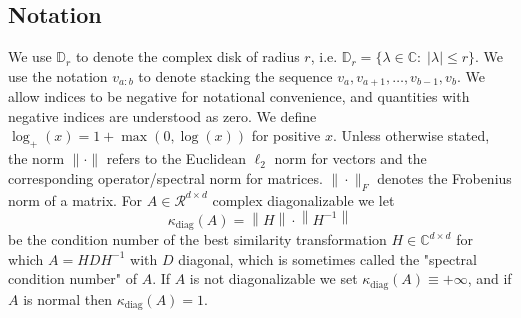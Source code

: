 \documentclass[11pt]{article}
\def\R{{\mathcal R}}
\newcommand{\norm}[1]{\left\lVert#1\right\rVert}
\def\R{\ensuremath{\mathcal R}}
\numberwithin{equation}{section}
\begin{document}
\subsection{Notation}
We use $\mathbb{D}_r$ to denote the complex disk of radius $r$, i.e. $\mathbb{D}_r = \{\lambda \in \mathbb{C}:\; |\lambda| \leq r\}$.
We use the notation $v_{a:b}$ to denote stacking the sequence $v_a, v_{a+1}, \ldots, v_{b-1}, v_b$. We allow indices to be negative for notational convenience, and quantities with negative indices are understood as zero. We define $\log_+(x) = 1 + \max(0, \log(x))$ for positive $x$. Unless otherwise stated, the norm $\|\cdot\|$ refers to the Euclidean $\ell_2$ norm for vectors and the corresponding operator/spectral norm for matrices. $\|\cdot\|_F$ denotes the Frobenius norm of a matrix. For $A \in \R^{d \times d}$ complex diagonalizable we let $$\kappa_{\textrm{diag}}(A) = \norm{H} \cdot \norm{H^{-1}}$$
be the condition number of the best similarity transformation $H \in \mathbb{C}^{d\times d}$ for which $A = HDH^{-1}$ with $D$ diagonal, which is sometimes called the "spectral condition number" of $A$. If $A$ is not diagonalizable we set $\kappa_{\textrm{diag}}(A) \equiv +\infty$, and if $A$ is normal then $\kappa_{\textrm{diag}}(A) = 1$. 

\end{document}
